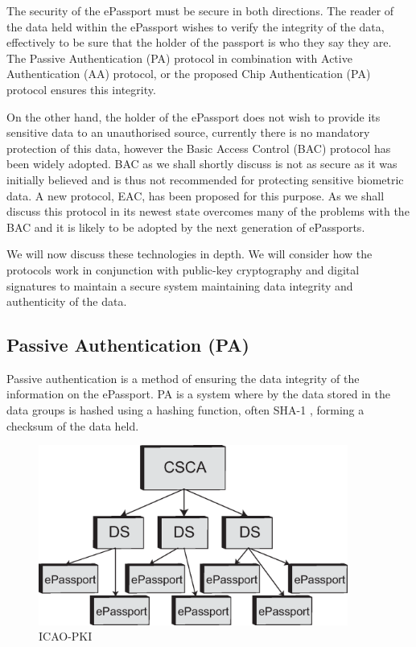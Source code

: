 \documentclass[12pt]{article}
\begin{document}
The security of the ePassport must be secure in both directions. The reader of the data held within the ePassport wishes to verify the integrity of the data, effectively to be sure that the holder of the passport is who they say they are. The Passive Authentication (PA) protocol in combination with Active Authentication (AA) protocol, or the proposed Chip Authentication (PA) protocol ensures this integrity.

On the other hand, the holder of the ePassport does not wish to provide its sensitive data to an unauthorised source, currently there is no mandatory protection of this data, however the Basic Access Control (BAC) protocol has been widely adopted. BAC as we shall shortly discuss is not as secure as it was initially believed and is thus not recommended for protecting sensitive biometric data. A new protocol, EAC, has been proposed for this purpose. As we shall discuss this protocol in its newest state overcomes many of the problems with the BAC and it is likely to be adopted by the next generation of ePassports.

We will now discuss these technologies in depth. We will consider how the protocols work in conjunction with public-key cryptography and digital signatures to maintain a secure system maintaining data integrity and authenticity of the data.  

\subsection{Passive Authentication (PA)}
\label{sec:PA}
Passive authentication is a method of ensuring the data integrity of the information on the ePassport. PA is a system where by the data stored in the data groups is hashed using a hashing function, often SHA-1 \cite{Avoine:2008wf}, forming a checksum of the data held. 

\begin{figure}
\centering
\includegraphics[width=4in]{IACO-PKI.eps}
\caption{ICAO-PKI}
\label{fig:ICAO-PKI}
\end{figure}
\end{document}
